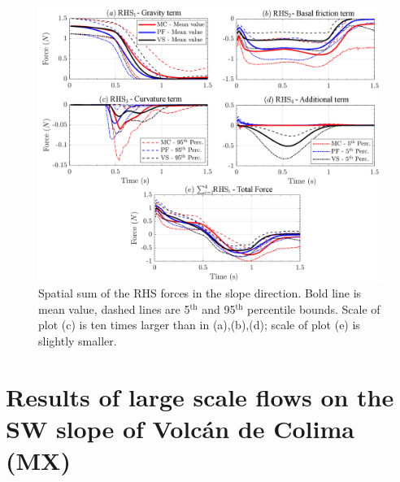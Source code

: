 \documentclass{article}
\begin{document}
\begin{figure}[H]
        \centering
        \includegraphics[width=1\textwidth]{InclinedPlane/AveragedMeasurments/ForcesIncline.png}
        \caption{Spatial sum of the RHS forces in the slope direction. Bold line is mean value, dashed lines are 5$^{\mathrm{th}}$ and 95$^{\mathrm{th}}$ percentile bounds. Scale of plot (c) is ten times larger than in (a),(b),(d); scale of plot (e) is slightly smaller.}
        \label{fig:Ramp-Fx-spatial}
\end{figure}
\newpage
\section{Results of large scale flows on the SW slope of Volc{\'a}n de Colima (MX)}
\end{document}
